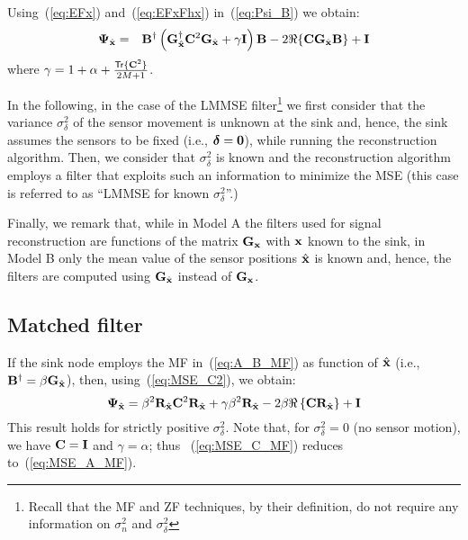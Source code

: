 \documentclass[final, a4paper]{IEEEtran}
\newcommand{\xv}{{\bf x}}
\newcommand{\zerov}{{\bf 0}}
\newcommand{\Bm}{{\bf B}}
\newcommand{\Cm}{{\bf C}}
\newcommand{\Gm}{{\bf G}}
\newcommand{\Id}{{\bf I}}
\newcommand{\Rm}{{\bf R}}
\def\xvh{{\hat{\xv}}}
\newcommand{\deltav}{\boldsymbol{\delta}}
\newcommand{\Psim}{\hbox{\boldmath$\Psi$}}
\def\trace{\mathsf{Tr}}
\def\non{\nonumber\\}
\begin{document}
Using~(\ref{eq:EFx}) and~(\ref{eq:EFxFhx}) in~(\ref{eq:Psi_B}) we obtain:
\begin{eqnarray}
\Psim_\xvh &=&  \Bm\Herm\left(\Gm_\xvh\Herm\Cm^2\Gm_\xvh + \gamma\Id\right)\Bm
- 2\Re\{\Cm\Gm_\xvh\Bm\} +\Id \non 
\label{eq:MSE_C2}
\end{eqnarray}
where $\gamma = 1+ \alpha +\frac{\trace\{\Cm^2\}}{2M+1}$.

In the following, in the case of the LMMSE filter\footnote{Recall that
the MF and ZF techniques, by their definition,
do not require any information on  $\sigma^2_n$ and $\sigma^2_{\delta}$}
we first consider that the variance
$\sigma^2_{\delta}$ of the sensor movement is unknown at the sink
and, hence, the sink  assumes the sensors to be fixed (i.e.,
$\deltav=\zerov$), while running the reconstruction algorithm. Then,
we consider that $\sigma^2_{\delta}$ is known and the reconstruction
algorithm employs a filter that exploits such an information to
minimize the MSE (this case is referred to as ``LMMSE for known
$\sigma_\delta^2$''.)

Finally, we remark that, while in Model A the filters used for
signal reconstruction are functions of the matrix $\Gm_\xv$ with
$\xv$ known to the sink, in Model B only the mean value of the
sensor positions $\xvh$ is known and, hence, the filters are
computed using $\Gm_\xvh$ instead of  $\Gm_\xv$.

\subsection{Matched filter}
\label{sec:MF_B}
If the sink node employs the MF in~(\ref{eq:A_B_MF})
as function of $\xvh$ (i.e., $\Bm\Herm = \beta\Gm_{\xvh}$),
then, using~(\ref{eq:MSE_C2}), we obtain:
\begin{equation}
\Psim_\xvh = \beta^2\Rm_\xvh\Cm^2\Rm_\xvh +\gamma\beta^2\Rm_\xvh -2\beta \Re\left\{\Cm\Rm_\xvh\right\}+\Id
\label{eq:MSE_C_MF}
\end{equation}
This result holds for strictly positive $\sigma^2_\delta$. Note that, for
$\sigma^2_\delta=0$ (no sensor motion), we have $\Cm=\Id$ and $\gamma=\alpha$;
thus ~(\ref{eq:MSE_C_MF}) reduces to~(\ref{eq:MSE_A_MF}).
\end{document}

